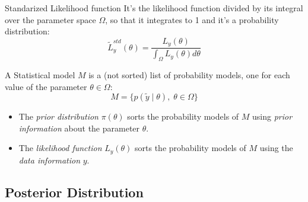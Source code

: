 \begin{definition}{Standarized Likelihood function}{}{}
	It's the likelihood function divided by its integral over the parameter space $\Omega$,
	so that it integrates to 1 and it's a probability distribution:
	\begin{equation}
		\tilde{L}_y^{std}(\theta) = \frac{L_y(\theta)}{\int_{\Omega} L_y(\theta) d\theta}
	\end{equation}
\end{definition}


\begin{recap}{}{}{}
	A Statistical model $M$ is a (not sorted) list of probability models, one for
	each value of the parameter $\theta \in \Omega$:
	\begin{equation*}
		M = \{ p(\tilde{y}\mid\theta), \; \theta \in \Omega \}
	\end{equation*}

	\begin{itemize}
		\item The \emph{prior distribution} $\pi(\theta)$ sorts the probability models of $M$
		      using \emph{prior information} about the parameter $\theta$.
		\item The \emph{likelihood function} $L_y(\theta)$ sorts the probability models of $M$
		      using the \emph{data information} $y$.
	\end{itemize}
\end{recap}

\subsection{Posterior Distribution}

